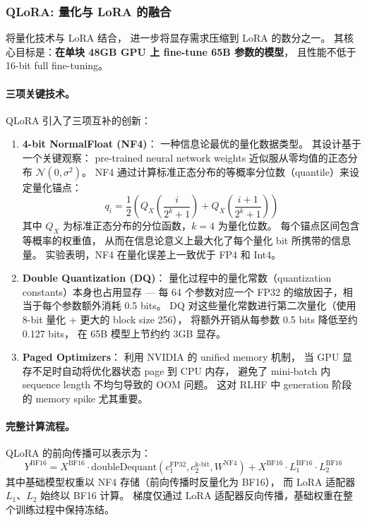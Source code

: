 \subsubsection{QLoRA: 量化与 LoRA 的融合}
\label{sec:t7-qlora}

 将量化技术与 LoRA 结合，
进一步将显存需求压缩到 LoRA 的数分之一。
其核心目标是：\textbf{在单块 48GB GPU 上 fine-tune 65B 参数的模型}，
且性能不低于 16-bit full fine-tuning。

\paragraph{三项关键技术。}
QLoRA 引入了三项互补的创新：

\begin{enumerate}[leftmargin=2em]
  \item \textbf{4-bit NormalFloat (NF4)}：
    一种信息论最优的量化数据类型。
    其设计基于一个关键观察：
    pre-trained neural network weights 近似服从零均值的正态分布 $\mathcal{N}(0, \sigma^2)$。
    NF4 通过计算标准正态分布的等概率分位数（quantile）来设定量化锚点：
    \begin{equation}
    q_i = \frac{1}{2}\left(Q_X\!\left(\frac{i}{2^k+1}\right) + Q_X\!\left(\frac{i+1}{2^k+1}\right)\right)
    \end{equation}
    其中 $Q_X$ 为标准正态分布的分位函数，$k = 4$ 为量化位数。
    每个锚点区间包含等概率的权重值，
    从而在信息论意义上最大化了每个量化 bit 所携带的信息量。
    实验表明，NF4 在量化误差上一致优于 FP4 和 Int4。

  \item \textbf{Double Quantization (DQ)}：
    量化过程中的量化常数（quantization constants）本身也占用显存 ---
    每 64 个参数对应一个 FP32 的缩放因子，相当于每个参数额外消耗 0.5 bits。
    DQ 对这些量化常数进行第二次量化（使用 8-bit 量化 + 更大的 block size 256），
    将额外开销从每参数 0.5 bits 降低至约 0.127 bits，
    在 65B 模型上节约约 3GB 显存。

  \item \textbf{Paged Optimizers}：
    利用 NVIDIA 的 unified memory 机制，
    当 GPU 显存不足时自动将优化器状态 page 到 CPU 内存，
    避免了 mini-batch 内 sequence length 不均匀导致的 OOM 问题。
    这对 RLHF 中 generation 阶段的 memory spike 尤其重要。
\end{enumerate}

\paragraph{完整计算流程。}
QLoRA 的前向传播可以表示为：
\begin{equation}
Y^{\text{BF16}} = X^{\text{BF16}} \cdot \text{doubleDequant}(c_1^{\text{FP32}}, c_2^{\text{k-bit}}, W^{\text{NF4}}) + X^{\text{BF16}} \cdot L_1^{\text{BF16}} \cdot L_2^{\text{BF16}}
\end{equation}
其中基础模型权重以 NF4 存储（前向传播时反量化为 BF16），
而 LoRA 适配器 $L_1$、$L_2$ 始终以 BF16 计算。
梯度仅通过 LoRA 适配器反向传播，基础权重在整个训练过程中保持冻结。

